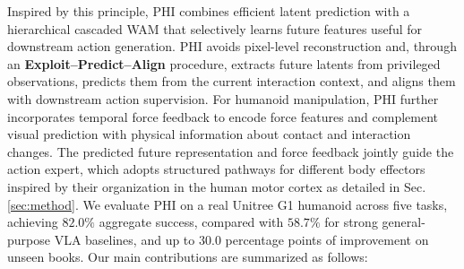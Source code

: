 \documentclass{article} %
\begin{document}


Inspired by this principle, PHI combines efficient latent prediction with a hierarchical cascaded WAM that selectively learns future features useful for downstream action generation. PHI avoids pixel-level reconstruction and, through an \textbf{Exploit–Predict–Align} procedure, extracts future latents from privileged observations, predicts them from the current interaction context, and aligns them with downstream action supervision. For humanoid manipulation, PHI further incorporates temporal force feedback to encode force features and complement visual prediction with physical information about contact and interaction changes. The predicted future representation and force feedback jointly guide the action expert, which adopts structured pathways for different body effectors inspired by their organization in the human motor cortex \cite{gordon2023somato} as detailed in Sec.\ref{sec:method}.  We evaluate PHI on a real Unitree G1 humanoid across five tasks, achieving $82.0\%$ aggregate success, compared with $58.7\%$ for strong general-purpose VLA baselines, and up to $30.0$ percentage points of improvement on unseen books. Our main contributions are summarized as follows: 
\end{document}
